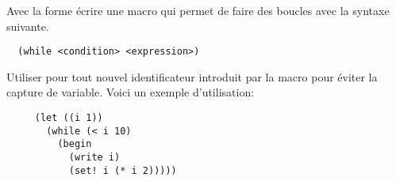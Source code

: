 Avec la forme  écrire une macro qui permet de faire des
boucles  avec la syntaxe suivante.

\begin{verbatim}
  (while <condition> <expression>)
\end{verbatim}

Utiliser  pour tout nouvel identificateur introduit par la
macro pour éviter la capture de variable.  Voici un exemple
d'utilisation:

\begin{verbatim}
     (let ((i 1))
       (while (< i 10)
         (begin
           (write i)
           (set! i (* i 2)))))
\end{verbatim}